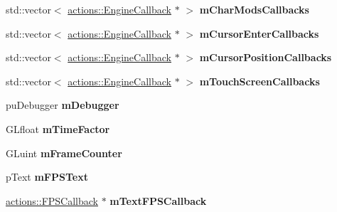 \begin{DoxyCompactItemize}
\item 
\hypertarget{structfillwave_1_1Engine_1_1EngineImpl_ab1eba1033161b25fb8f4252941e13903}{}std\+::vector$<$ \hyperlink{classfillwave_1_1actions_1_1EngineCallback}{actions\+::\+Engine\+Callback} $\ast$ $>$ {\bfseries m\+Char\+Mods\+Callbacks}\label{structfillwave_1_1Engine_1_1EngineImpl_ab1eba1033161b25fb8f4252941e13903}

\item 
\hypertarget{structfillwave_1_1Engine_1_1EngineImpl_a0fb169078c0634238ec6d270951d4f26}{}std\+::vector$<$ \hyperlink{classfillwave_1_1actions_1_1EngineCallback}{actions\+::\+Engine\+Callback} $\ast$ $>$ {\bfseries m\+Cursor\+Enter\+Callbacks}\label{structfillwave_1_1Engine_1_1EngineImpl_a0fb169078c0634238ec6d270951d4f26}

\item 
\hypertarget{structfillwave_1_1Engine_1_1EngineImpl_a450f3a7927e70ebf864c43377be0224e}{}std\+::vector$<$ \hyperlink{classfillwave_1_1actions_1_1EngineCallback}{actions\+::\+Engine\+Callback} $\ast$ $>$ {\bfseries m\+Cursor\+Position\+Callbacks}\label{structfillwave_1_1Engine_1_1EngineImpl_a450f3a7927e70ebf864c43377be0224e}

\item 
\hypertarget{structfillwave_1_1Engine_1_1EngineImpl_a8bcc2387ecdf7990964da794f0c00b5c}{}std\+::vector$<$ \hyperlink{classfillwave_1_1actions_1_1EngineCallback}{actions\+::\+Engine\+Callback} $\ast$ $>$ {\bfseries m\+Touch\+Screen\+Callbacks}\label{structfillwave_1_1Engine_1_1EngineImpl_a8bcc2387ecdf7990964da794f0c00b5c}

\item 
\hypertarget{structfillwave_1_1Engine_1_1EngineImpl_aae5e9365d348094b4cdb1e56d1350e6d}{}pu\+Debugger {\bfseries m\+Debugger}\label{structfillwave_1_1Engine_1_1EngineImpl_aae5e9365d348094b4cdb1e56d1350e6d}

\item 
\hypertarget{structfillwave_1_1Engine_1_1EngineImpl_a1da0282b081228d083e474b0deb687a1}{}G\+Lfloat {\bfseries m\+Time\+Factor}\label{structfillwave_1_1Engine_1_1EngineImpl_a1da0282b081228d083e474b0deb687a1}

\item 
\hypertarget{structfillwave_1_1Engine_1_1EngineImpl_a69124578a12b055872db1b88887123bf}{}G\+Luint {\bfseries m\+Frame\+Counter}\label{structfillwave_1_1Engine_1_1EngineImpl_a69124578a12b055872db1b88887123bf}

\item 
\hypertarget{structfillwave_1_1Engine_1_1EngineImpl_a63edf775bffb324adb05b47c46e5aa98}{}p\+Text {\bfseries m\+F\+P\+S\+Text}\label{structfillwave_1_1Engine_1_1EngineImpl_a63edf775bffb324adb05b47c46e5aa98}

\item 
\hypertarget{structfillwave_1_1Engine_1_1EngineImpl_a32c1c13f59835e26530644fcf2d9ca2d}{}\hyperlink{classfillwave_1_1actions_1_1FPSCallback}{actions\+::\+F\+P\+S\+Callback} $\ast$ {\bfseries m\+Text\+F\+P\+S\+Callback}\label{structfillwave_1_1Engine_1_1EngineImpl_a32c1c13f59835e26530644fcf2d9ca2d}

\end{DoxyCompactItemize}
